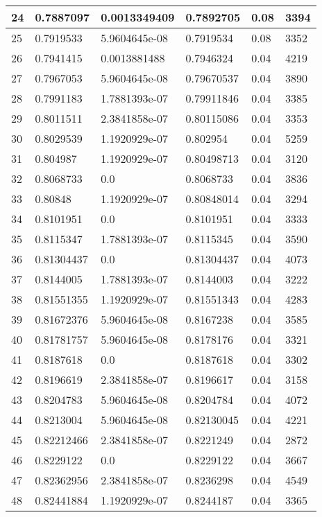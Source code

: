 \begin{longtable}{|l|l|l|l|l|l|}
24 & 0.7887097 & 0.0013349409 & 0.7892705 & 0.08 & 3394 \\ \hline 
25 & 0.7919533 & 5.9604645e-08 & 0.7919534 & 0.08 & 3352 \\ \hline 
26 & 0.7941415 & 0.0013881488 & 0.7946324 & 0.04 & 4219 \\ \hline 
27 & 0.7967053 & 5.9604645e-08 & 0.79670537 & 0.04 & 3890 \\ \hline 
28 & 0.7991183 & 1.7881393e-07 & 0.79911846 & 0.04 & 3385 \\ \hline 
29 & 0.8011511 & 2.3841858e-07 & 0.80115086 & 0.04 & 3353 \\ \hline 
30 & 0.8029539 & 1.1920929e-07 & 0.802954 & 0.04 & 5259 \\ \hline 
31 & 0.804987 & 1.1920929e-07 & 0.80498713 & 0.04 & 3120 \\ \hline 
32 & 0.8068733 & 0.0 & 0.8068733 & 0.04 & 3836 \\ \hline 
33 & 0.80848 & 1.1920929e-07 & 0.80848014 & 0.04 & 3294 \\ \hline 
34 & 0.8101951 & 0.0 & 0.8101951 & 0.04 & 3333 \\ \hline 
35 & 0.8115347 & 1.7881393e-07 & 0.8115345 & 0.04 & 3590 \\ \hline 
36 & 0.81304437 & 0.0 & 0.81304437 & 0.04 & 4073 \\ \hline 
37 & 0.8144005 & 1.7881393e-07 & 0.8144003 & 0.04 & 3222 \\ \hline 
38 & 0.81551355 & 1.1920929e-07 & 0.81551343 & 0.04 & 4283 \\ \hline 
39 & 0.81672376 & 5.9604645e-08 & 0.8167238 & 0.04 & 3585 \\ \hline 
40 & 0.81781757 & 5.9604645e-08 & 0.8178176 & 0.04 & 3321 \\ \hline 
41 & 0.8187618 & 0.0 & 0.8187618 & 0.04 & 3302 \\ \hline 
42 & 0.8196619 & 2.3841858e-07 & 0.8196617 & 0.04 & 3158 \\ \hline 
43 & 0.8204783 & 5.9604645e-08 & 0.8204784 & 0.04 & 4072 \\ \hline 
44 & 0.8213004 & 5.9604645e-08 & 0.82130045 & 0.04 & 4221 \\ \hline 
45 & 0.82212466 & 2.3841858e-07 & 0.8221249 & 0.04 & 2872 \\ \hline 
46 & 0.8229122 & 0.0 & 0.8229122 & 0.04 & 3667 \\ \hline 
47 & 0.82362956 & 2.3841858e-07 & 0.8236298 & 0.04 & 4549 \\ \hline 
48 & 0.82441884 & 1.1920929e-07 & 0.8244187 & 0.04 & 3365 \\ \hline 

\end{longtable}
